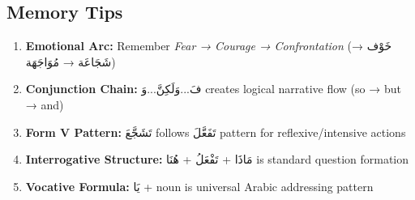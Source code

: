 \documentclass[letterpaper,12pt]{article}
\begin{document}
\subsection{Memory Tips}
\begin{enumerate}
\item \textbf{Emotional Arc:} Remember \textit{Fear → Courage → Confrontation} (\textarabic{خَوْف} → \textarabic{شَجَاعَة} → \textarabic{مُوَاجَهَة})
\item \textbf{Conjunction Chain:} \textarabic{فَ...وَلَكِنَّ...وَ} creates logical narrative flow (so → but → and)
\item \textbf{Form V Pattern:} \textarabic{تَشَجَّعَ} follows \textarabic{تَفَعَّلَ} pattern for reflexive/intensive actions
\item \textbf{Interrogative Structure:} \textarabic{مَاذَا + تَفْعَلُ + هُنَا} is standard question formation
\item \textbf{Vocative Formula:} \textarabic{يَا + noun} is universal Arabic addressing pattern
\end{enumerate}
\end{document}
